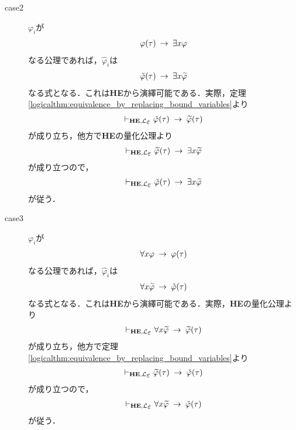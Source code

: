 \begin{metaprf}
\begin{description}
			\item[case2] $\varphi_{i}$が
				\begin{align}
					\varphi(\tau) \hspace{0.25em}\rightarrow\hspace{0.25em} \exists x \varphi
				\end{align}
				なる公理であれば，$\widehat{\varphi}_{i}$は
				\begin{align}
					\check{\varphi}(\tau) \hspace{0.25em}\rightarrow\hspace{0.25em} \exists x \widetilde{\varphi}
				\end{align}
				なる式となる．これは{\bf HE}から演繹可能である．実際，定理\ref{logicalthm:equivalence_by_replacing_bound_variables}より
				\begin{align}
					\provable{\mbox{{\bf HE}},\lang{\varepsilon}} \check{\varphi}(\tau) \rarrow \widetilde{\varphi}(\tau)
				\end{align}
				が成り立ち，他方で{\bf HE}の量化公理より
				\begin{align}
					\provable{\mbox{{\bf HE}},\lang{\varepsilon}} \widetilde{\varphi}(\tau) \rarrow \exists x \widetilde{\varphi}
				\end{align}
				が成り立つので，
				\begin{align}
					\provable{\mbox{{\bf HE}},\lang{\varepsilon}} \check{\varphi}(\tau) \rarrow \exists x \widetilde{\varphi}
				\end{align}
				が従う．
				
			\item[case3] $\varphi_{i}$が
				\begin{align}
					\forall x \varphi \hspace{0.25em}\rightarrow\hspace{0.25em} \varphi(\tau)
				\end{align}
				なる公理であれば，$\widehat{\varphi}_{i}$は
				\begin{align}
					\forall x \widetilde{\varphi} \hspace{0.25em}\rightarrow\hspace{0.25em} \check{\varphi}(\tau)
				\end{align}
				なる式となる．これは{\bf HE}から演繹可能である．実際，{\bf HE}の量化公理より
				\begin{align}
					\provable{\mbox{{\bf HE}},\lang{\varepsilon}} \forall x \widetilde{\varphi} \rarrow \widetilde{\varphi}(\tau)
				\end{align}
				が成り立ち，他方で定理\ref{logicalthm:equivalence_by_replacing_bound_variables}より
				\begin{align}
					\provable{\mbox{{\bf HE}},\lang{\varepsilon}} \widetilde{\varphi}(\tau) \rarrow \check{\varphi}(\tau)
				\end{align}
				が成り立つので，
				\begin{align}
					\provable{\mbox{{\bf HE}},\lang{\varepsilon}} \forall x \widetilde{\varphi} \rarrow \check{\varphi}(\tau)
				\end{align}
				が従う．
				

\end{description}
\end{metaprf}
